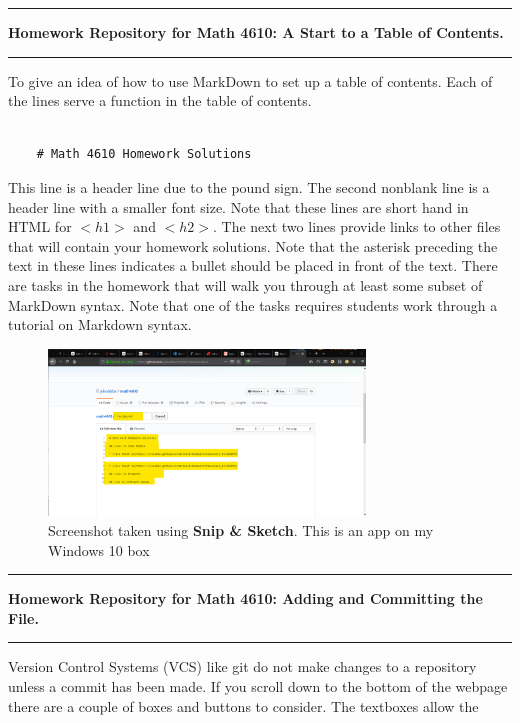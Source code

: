 \documentclass[10pt,fleqn]{article}
\begin{document}
\eject
\vskip0.1in\hrule\vskip0.1in
\noindent
{\bf Homework Repository for Math 4610: A Start to a Table of Contents.} 
\vskip0.1in\hrule\vskip0.1in
To give an idea of how to use MarkDown to set up a table of contents. Each of
the lines serve a function in the table of contents.
\begin{verbatim}

    # Math 4610 Homework Solutions

\end{verbatim}
This line is a header line due to the pound sign. The second nonblank line is a
header line with a smaller font size. Note that these lines are short hand in
HTML for $<h1>$ and $<h2>$. The next two lines provide links to other files that
will contain your homework solutions. Note that the asterisk preceding the text
in these lines indicates a bullet should be placed in front of the text. There
are tasks in the homework that will walk you through at least some subset of
MarkDown syntax. Note that one of the tasks requires students work through a
tutorial on Markdown syntax.
\vfill
\begin{figure}[h]
\centering
\includegraphics[width=0.75\textwidth]{../images/github_06.png}
\caption{{Screenshot} taken using {\bf Snip \& Sketch}. This is an app on
         my Windows 10 box}
\end{figure}
\eject
\vskip0.1in\hrule\vskip0.1in
\noindent
{\bf Homework Repository for Math 4610: Adding and Committing the File.} 
\vskip0.1in\hrule\vskip0.1in
Version Control Systems (VCS) like git do not make changes to a repository 
unless a commit has been made. If you scroll down to the bottom of the webpage
there are a couple of boxes and buttons to consider. The textboxes allow the
\end{document}
